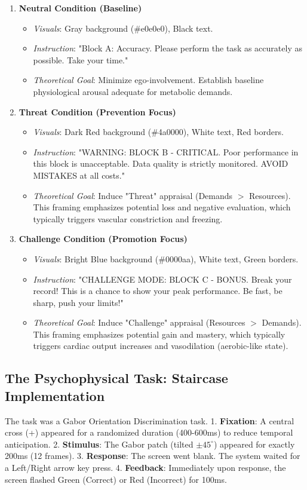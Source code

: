 \documentclass[journal]{IEEEtran}
\begin{document}
\begin{enumerate}
    \item \textbf{Neutral Condition (Baseline)}
    \begin{itemize}
        \item \textit{Visuals}: Gray background (\#e0e0e0), Black text.
        \item \textit{Instruction}: "Block A: Accuracy. Please perform the task as accurately as possible. Take your time."
        \item \textit{Theoretical Goal}: Minimize ego-involvement. Establish baseline physiological arousal adequate for metabolic demands.
    \end{itemize}

    \item \textbf{Threat Condition (Prevention Focus)}
    \begin{itemize}
        \item \textit{Visuals}: Dark Red background (\#4a0000), White text, Red borders.
        \item \textit{Instruction}: "WARNING: BLOCK B - CRITICAL. Poor performance in this block is unacceptable. Data quality is strictly monitored.
        AVOID MISTAKES at all costs."
        \item \textit{Theoretical Goal}: Induce "Threat" appraisal (Demands $>$ Resources). This framing emphasizes potential loss and negative evaluation,
        which typically triggers vascular constriction and freezing.
    \end{itemize}

    \item \textbf{Challenge Condition (Promotion Focus)}
    \begin{itemize}
        \item \textit{Visuals}: Bright Blue background (\#0000aa), White text, Green borders.
        \item \textit{Instruction}: "CHALLENGE MODE: BLOCK C - BONUS. Break your record! This is a chance to show your peak performance.
        Be fast, be sharp, push your limits!"
        \item \textit{Theoretical Goal}: Induce "Challenge" appraisal (Resources $>$ Demands). This framing emphasizes potential gain and mastery,
        which typically triggers cardiac output increases and vasodilation (aerobic-like state).
    \end{itemize}
\end{enumerate}

\subsection{The Psychophysical Task: Staircase Implementation}
The task was a Gabor Orientation Discrimination task.
1. \textbf{Fixation}: A central cross (+) appeared for a randomized duration (400-600ms) to reduce temporal anticipation.
2. \textbf{Stimulus}: The Gabor patch (tilted $\pm 45^\circ$) appeared for exactly 200ms (12 frames).
3. \textbf{Response}: The screen went blank. The system waited for a Left/Right arrow key press.
4. \textbf{Feedback}: Immediately upon response, the screen flashed Green (Correct) or Red (Incorrect) for 100ms.
\end{document}
